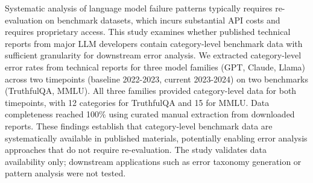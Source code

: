 
Systematic analysis of language model failure patterns typically requires re-evaluation on benchmark datasets, which incurs substantial API costs and requires proprietary access. This study examines whether published technical reports from major LLM developers contain category-level benchmark data with sufficient granularity for downstream error analysis. We extracted category-level error rates from technical reports for three model families (GPT, Claude, Llama) across two timepoints (baseline 2022-2023, current 2023-2024) on two benchmarks (TruthfulQA, MMLU). All three families provided category-level data for both timepoints, with 12 categories for TruthfulQA and 15 for MMLU. Data completeness reached 100\% using curated manual extraction from downloaded reports. These findings establish that category-level benchmark data are systematically available in published materials, potentially enabling error analysis approaches that do not require re-evaluation. The study validates data availability only; downstream applications such as error taxonomy generation or pattern analysis were not tested.

